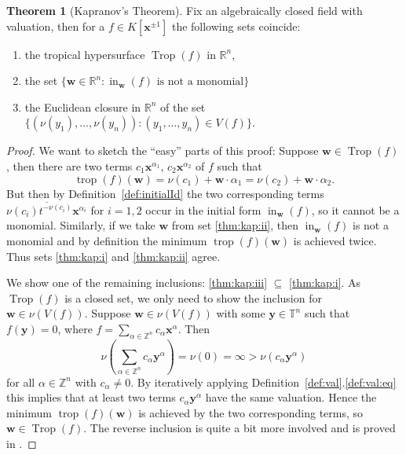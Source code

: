 \documentclass[
  paper=a4,
  titlepage,
  bibliography=totoc,
  listof=totoc,
  pagesize=pdftex
]{scrartcl}
\numberwithin{figure}{section}
\numberwithin{equation}{section}
\numberwithin{table}{section}
\newcommand*\setZ{\mathds{Z}}
\newcommand*\setR{\mathds{R}}
\newcommand*\setT{\mathds{T}}
\let\vec\mathbf
\DeclareMathOperator{\Trop}{Trop}
\DeclareMathOperator{\trop}{trop}
\DeclareMathOperator{\initial}{in}
\theoremstyle{definition}
\newtheorem{theorem}[definition]{Theorem}
\numberwithin{definition}{section}
\begin{document}
\begin{theorem}[Kapranov's Theorem]
  \label{thm:kapranov}
  Fix an algebraically closed field with valuation, then for a $f \in K[\vec x^{\pm1}]$
  the following sets coincide:
  \begin{enumerate}
    \item the tropical hypersurface $\Trop(f)$ in $\setR^n$,
      \label{thm:kap:i}
    \item the set $\{ \vec w \in \setR^n : \initial_{\vec w}(f) \text{ is not a
      monomial}\}$
      \label{thm:kap:ii}
    \item the Euclidean closure in $\setR^n$ of the set $\{ (\nu(y_1), \dots, \nu(y_n)) :
      (y_1,\dots,y_n) \in V(f) \}$.
      \label{thm:kap:iii}
  \end{enumerate}
  \begin{proof}
    We want to sketch the \enquote{easy} parts of this proof: Suppose $\vec w \in
    \Trop(f)$, then there are two terms $c_1 \vec x^{\alpha_1}$, $c_2 \vec x^{\alpha_2}$
    of $f$ such that
    \[
      \trop(f)(\vec w) = \nu(c_1) + \vec w \cdot \alpha_1 = \nu(c_2) + \vec w \cdot \alpha_2.
    \]
    But then by Definition~\ref{def:initialId} the two corresponding terms
    $\overline{\nu(c_i)t^{-\nu(c_i)}\vec x^{\alpha_i}}$ for $i=1,2$ occur in the initial
    form $\initial_{\vec w}(f)$, so it cannot be a monomial. Similarly, if we take $\vec
    w$ from set \ref{thm:kap:ii}, then $\initial_{\vec w}(f)$ is not a monomial and by
    definition the minimum $\trop(f)(\vec w)$ is achieved twice. Thus sets \ref{thm:kap:i}
    and \ref{thm:kap:ii} agree.

    We show one of the remaining inclusions: \ref{thm:kap:iii} $\subseteq$
    \ref{thm:kap:i}. As $\Trop(f)$ is a closed set, we only need to show the inclusion for
    $\vec w \in \nu(V(f))$. Suppose $\vec w \in \nu(V(f))$ with some $\vec y \in \setT^n$
    such that $f(\vec y) = 0$, where $f = \sum_{\alpha \in \setZ^n} c_\alpha \vec
    x^\alpha$. Then
    \[
      \nu \left( \sum_{\alpha \in \setZ^n} c_\alpha \vec y^\alpha \right) = \nu(0) =
      \infty > \nu(c_\alpha \vec y^\alpha)
    \]
    for all $\alpha \in \setZ^n$ with $c_\alpha \neq 0$. By iteratively applying
    Definition~\ref{def:val}.\ref{def:val:eq} this implies that at least two terms
    $c_\alpha \vec y^\alpha$ have the same valuation. Hence the minimum $\trop(f)(\vec w)$
    is achieved by the two corresponding terms, so $\vec w \in \Trop(f)$. The reverse
    inclusion is quite a bit more involved and is proved in
    \cite[Proposition~3.1.5]{sturmMacTrop}.
  \end{proof}
\end{theorem}
\end{document}
